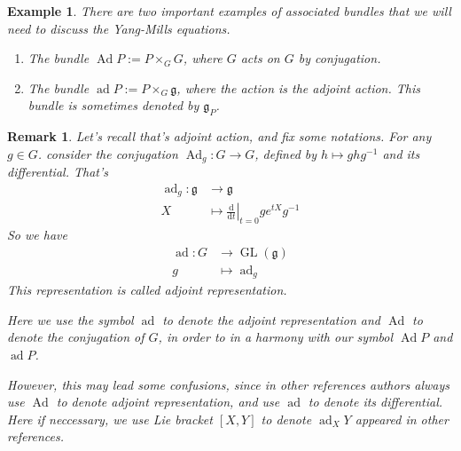 \documentclass[11pt]{amsart}
\numberwithin{equation}{section}
\theoremstyle{plain}
\theoremstyle{plain}
\newtheorem{remksub}[thmsub]{Remark}
\newtheorem{exsub}[thmsub]{Example}
\numberwithin{equation}{section}
\begin{document}
\begin{exsub}\normalfont
There are two important examples of associated bundles that we will need to discuss the Yang-Mills equations.
\begin{enumerate}[$1.$]
\item The bundle $\operatorname{Ad}P:=P\times_GG$, where $G$ acts on $G$ by conjugation.
\item The bundle $\operatorname{ad}P:=P\times_G\mathfrak{g}$, where the action is the adjoint action. This bundle is sometimes denoted by $\mathfrak{g}_P$.
\end{enumerate}
\end{exsub}
\begin{remksub}\normalfont
Let's recall that's adjoint action, and fix some notations. For any $g\in G$. consider the conjugation $\operatorname{Ad}_g:G\to G$, defined by $h\mapsto ghg^{-1}$ and its differential. That's
$$
\begin{aligned}
\operatorname{ad}_g:\mathfrak{g}&\to\mathfrak{g}\\
X&\mapsto\left.\frac{\mathrm{d}}{\mathrm{d}t}\right|_{t=0}ge^{tX}g^{-1}
\end{aligned}
$$
So we have 
$$
\begin{aligned}
\operatorname{ad}:G&\to\operatorname{GL}(\mathfrak{g})\\
g&\mapsto\operatorname{ad}_g
\end{aligned}
$$
This representation is called adjoint representation. 

Here we use the symbol $\operatorname{ad}$ to denote the adjoint representation and $\operatorname{Ad}$ to denote the conjugation of $G$, in order to in a harmony with our symbol $\operatorname{Ad}P$ and $\operatorname{ad}P$. 

However, this may lead some confusions, since in other references authors always use $\operatorname{Ad}$ to denote adjoint representation, and use $\operatorname{ad}$ to denote its differential. Here if neccessary, we use Lie bracket ${[X,Y]}$ to denote $\operatorname{ad}_XY$ appeared in other references.
\end{remksub}
\end{document}
